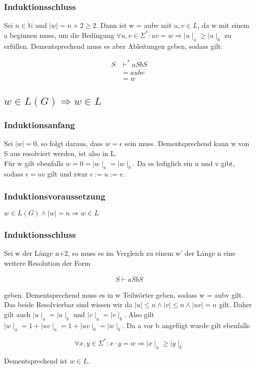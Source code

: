 \documentclass[12pt, a4paper]{article}
\begin{document}
\subsubsection*{Induktionsschluss}
Sei $n \in \mathbb{N}$ und $\mid w \mid = n +2 \ge 2$. Dann ist w = aubv mit $u,v \in L$, da w mit einem a beginnen muss, um die Bedingung $\forall u,v \in \Sigma^*: uv = w \Rightarrow \mid u \mid_a \ge \mid u \mid_b$ zu erfüllen. Dementsprechend muss es aber Ableitungen geben, sodass gilt: 

\begin{align*}
S &\vdash^* aSbS \\
&= aubv \\
&= w
\end{align*}

\subsection*{$w \in L(G) \Rightarrow w \in L$}
\subsubsection*{Induktionsanfang}
Sei $\mid w \mid = 0$, so folgt daraus, dass $w = \epsilon$ sein muss. Dementsprechend kann w von S aus resolviert werden, ist also in L.\\
Für w gilt ebenfalls $w = 0 = \mid w \mid_a = \mid w \mid_b $. Da es lediglich ein u und v gibt, sodass $ \epsilon = uv$ gilt und zwar $\epsilon := u := v$.

\subsubsection*{Induktionsvoraussetzung}
$w \in L(G) \wedge \mid w \mid = n  \Rightarrow w \in L$

\subsubsection*{Induktionsschluss}
Sei w der Länge n+2, so muss es im Vergleich zu einem w' der Länge n eine weitere Resolution der Form 

\begin{align*}
S \vdash aSbS
\end{align*}

geben. Dementsprechend muss es in w Teilwörter geben, sodass w = aubv gilt.
Das beide Resolvierbar sind wissen wir da $\mid u \mid \le n \wedge \mid v \mid \le n \wedge \mid uv \mid = n$ gilt. Daher gilt auch $\mid u \mid_a = \mid u \mid_b$ und $\mid v \mid_a = \mid v \mid_b$. Also gilt $\mid w  \mid_a = 1 + \mid uv \mid_a = 1 + \mid uv \mid_b = \mid w \mid_b$. Da a vor b angefügt wurde gilt ebenfalls 

\begin{equation}
\forall x,y \in \Sigma^*: x \cdot y = w \Rightarrow \mid x \mid_{a} \ge \mid y \mid_{b}
\end{equation}

Dementsprechend ist $w \in L$.
\end{document}
